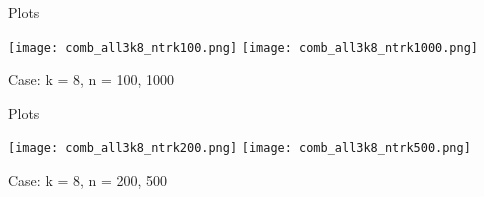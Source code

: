 \documentclass[aspectratio=169,compress,10pt]{beamer} %
\begin{document}
\begin{frame}{Plots}
\begin{adjustwidth}{-2em}{-2em}
\texttt{[image: comb\_all3k8\_ntrk100.png]}
\texttt{[image: comb\_all3k8\_ntrk1000.png]}
\caption{Case: k = 8, n = 100, 1000}
\end{adjustwidth}
\end{frame}

\begin{frame}{Plots}
\begin{adjustwidth}{-2em}{-2em}
\texttt{[image: comb\_all3k8\_ntrk200.png]}
\texttt{[image: comb\_all3k8\_ntrk500.png]}
\caption{Case: k = 8, n = 200, 500}
\end{adjustwidth}
\end{frame}
\end{document}
